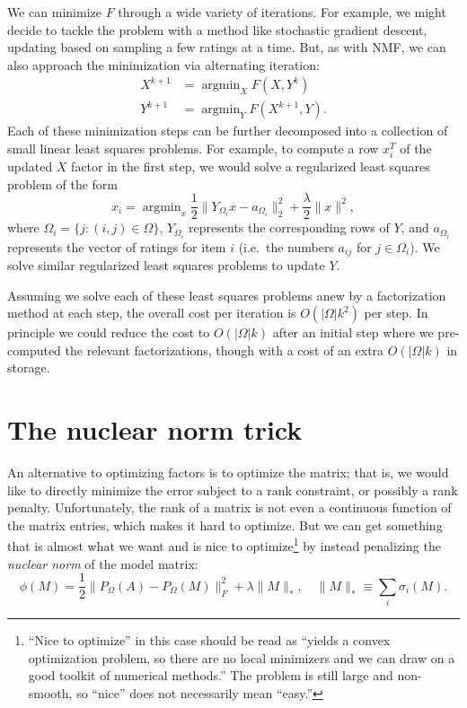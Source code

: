 \documentclass[12pt, leqno]{article} %
\begin{document}
We can minimize $F$ through a wide variety of iterations.
For example, we might decide to tackle the problem with a method like
stochastic gradient descent, updating based on sampling a few ratings
at a time.  But, as with NMF, we can also approach the minimization
via alternating iteration:
\begin{align*}
  X^{k+1} &= \operatorname{argmin}_X F(X,Y^k) \\
  Y^{k+1} &= \operatorname{argmin}_Y F(X^{k+1},Y).
\end{align*}
Each of these minimization steps can be further decomposed
into a collection of small linear least squares problems.
For example, to compute a row $x_i^T$ of the updated $X$
factor in the first step, we would solve a regularized
least squares problem of the form
\[
  x_i = \operatorname{argmin}_x
  \frac{1}{2} \| Y_{\Omega_i} x - a_{\Omega_i} \|_2^2 +
  \frac{\lambda}{2} \|x\|^2,
\]
where $\Omega_i = \{ j : (i,j) \in \Omega \}$,
$Y_{\Omega_i}$ represents the corresponding rows of $Y$,
and $a_{\Omega_i}$ represents the vector of ratings for
item $i$ (i.e.~the numbers $a_{ij}$ for $j \in \Omega_i$).
We solve similar regularized least squares problems to update $Y$.

Assuming we solve each of these least squares problems anew by a
factorization method at each step, the overall cost per iteration is
$O(|\Omega| k^2)$ per step.  In principle we could reduce the cost to
$O(|\Omega| k)$ after an initial step where we pre-computed the
relevant factorizations, though with a cost of an extra $O(|\Omega|
k)$ in storage.

\section{The nuclear norm trick}

An alternative to optimizing factors is to optimize the matrix;
that is, we would like to directly minimize the error subject to
a rank constraint, or possibly a rank penalty.  Unfortunately,
the rank of a matrix is not even a continuous function of the
matrix entries, which makes it hard to optimize.  But we can get
something that is almost what we want and is nice to optimize\footnote{%
  ``Nice to optimize'' in this case should be read as ``yields a
  convex optimization problem, so there are no local minimizers and we
  can draw on a good toolkit of numerical methods.''  The problem is
  still large and non-smooth, so ``nice'' does not necessarily mean
  ``easy.''}
by instead penalizing the {\em nuclear norm} of the model matrix:
\[
\phi(M) =
  \frac{1}{2} \|P_{\Omega}(A) - P_{\Omega}(M)\|_F^2 +
  \lambda \|M\|_*, \quad
  \|M\|_* \equiv \sum_i \sigma_i(M).
\]
\end{document}
